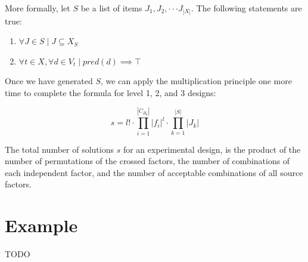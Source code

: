 More formally, let $S$ be a list of items $J_1, J_2, \cdot\cdot\cdot J_{|X|}$. The following statements are true:

\begin{enumerate}
\item $\forall J \in S \mid J \subseteq X_S$
\item $\forall t \in X,  \forall d \in V_t \mid pred(d) \implies \top$
\end{enumerate}

Once we have generated $S$, we can apply the multiplication principle one more time to complete the formula for level 1, 2, and 3 designs:

\[
s = l! \cdot \prod_{i=1}^{|\overline{C}_{B_I}|} |f_i|^l \cdot \prod_{k=1}^{|S|} |J_k|
\]

The total number of solutions $s$ for an experimental design, is the product of the number of permutations of the crossed factors, the number of combinations of each independent factor, and the number of acceptable combinations of all source factors.


\section{Example}

TODO

